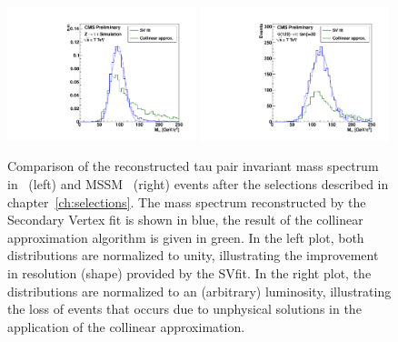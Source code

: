 \begin{figure}[t]
\begin{center}
\includegraphics*[width=0.49\textwidth]{svfit_chapter/figures/sv_fit_approval_plots/sv_vs_coll_ZTT_normed.pdf}
\includegraphics*[width=0.49\textwidth]{svfit_chapter/figures/sv_fit_approval_plots/sv_vs_coll_A120.pdf}
\caption[Comparison of SVfit with the collinear approximation
algorithm]{Comparison of the reconstructed tau pair invariant mass spectrum in
\ZTT~(left) and MSSM ~(right) events after the selections described in
chapter~\ref{ch:selections}.  The mass spectrum reconstructed by the Secondary
Vertex fit is shown in blue, the result of the collinear approximation algorithm
is given in green.  In the left plot, both distributions are normalized to
unity, illustrating the improvement in resolution (shape) provided by the SVfit.
In the right plot, the distributions are normalized to an (arbitrary)
luminosity, illustrating the loss of events that occurs due to unphysical
solutions in the application of the collinear approximation.}

\label{fig:SVversusCollinear}
\end{center}
\end{figure} 

